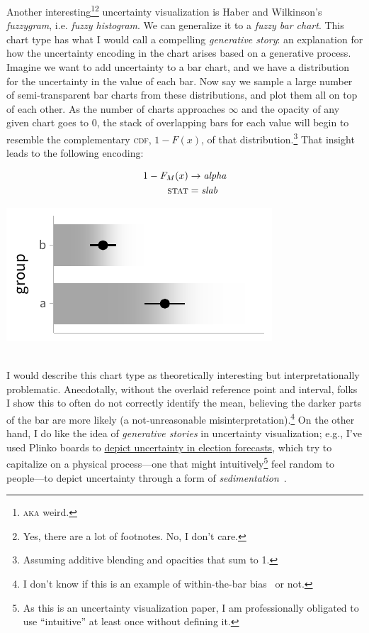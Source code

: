 \documentclass[journal]{vgtc}                     %
\newcommand{\equationfigure}[2]{%
\noindent
\begin{minipage}{.5\columnwidth}
\setlength{\abovedisplayskip}{0pt}
\setlength{\belowdisplayskip}{0pt}
#1\end{minipage}%
\begin{minipage}{.4\columnwidth}\centering #2 \end{minipage}%
\vspace{.5\belowdisplayskip}\\
}
\begin{document}
Another interesting\footnote{\textsc{aka} weird.}\footnote{Yes, there are a lot of footnotes. No, I don't care.} uncertainty visualization is Haber and Wilkinson's~\cite{haber1982perceptual} \textit{fuzzygram}, i.e. \textit{fuzzy histogram}. We can generalize it to a \textit{fuzzy bar chart}. This chart type has what I would call a compelling \textit{generative story}: an explanation for how the uncertainty encoding in the chart arises based on a generative process. Imagine we want to add uncertainty to a bar chart, and we have a distribution for the uncertainty in the value of each bar. Now say we sample a large number of semi-transparent bar charts from these distributions, and plot them all on top of each other. As the number of charts approaches $\infty$ and the opacity of any given chart goes to 0, the stack of overlapping bars for each value will begin to resemble the complementary \textsc{cdf}, $1 - F(x)$, of that distribution.\footnote{Assuming additive blending and opacities that sum to 1.} That insight leads to the following encoding:

\equationfigure{
\begin{align*}
1 - F_M(x) &\rightarrow \textit{alpha}\\
\textsc{stat} &= \mathit{slab}
\end{align*}
}{\includegraphics[width=1.2\columnwidth]{figs/3-slab_fuzzygram.pdf}}
I would describe this chart type as theoretically interesting but interpretationally problematic. Anecdotally, without the overlaid reference point and interval, folks I show this to often do not correctly identify the mean, believing the darker parts of the bar are more likely (a not-unreasonable misinterpretation).\footnote{I don't know if this is an example of within-the-bar bias~\cite{newman2012bar} or not.} On the other hand, I do like the idea of \textit{generative stories} in uncertainty visualization; e.g., I've used Plinko boards to \href{https://presidential-plinko.com/}{depict uncertainty in election forecasts}, which try to capitalize on a physical process---one that might intuitively\footnote{As this is an uncertainty visualization paper, I am professionally obligated to use ``intuitive'' at least once without defining it.} feel random to people---to depict uncertainty through a form of \textit{sedimentation}~\cite{huron2013sediment}.
\end{document}
